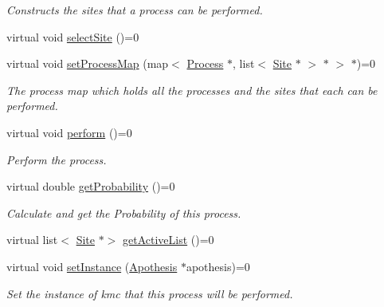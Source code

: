\begin{DoxyCompactItemize}
\begin{DoxyCompactList}\small\item\em Constructs the sites that a process can be performed. \end{DoxyCompactList}\item 
virtual void \mbox{\hyperlink{classMicroProcesses_1_1Process_a5b0a36197e03be4f36465a6b9d4f867f}{select\+Site}} ()=0
\item 
\mbox{\label{classMicroProcesses_1_1Process_a4e726f7491eb805efd9dcd1c0c3a380f}} 
virtual void \mbox{\hyperlink{classMicroProcesses_1_1Process_a4e726f7491eb805efd9dcd1c0c3a380f}{set\+Process\+Map}} (map$<$ \mbox{\hyperlink{classMicroProcesses_1_1Process}{Process}} $\ast$, list$<$ \mbox{\hyperlink{classSurfaceTiles_1_1Site}{Site}} $\ast$ $>$ $\ast$ $>$ $\ast$)=0
\begin{DoxyCompactList}\small\item\em The process map which holds all the processes and the sites that each can be performed. \end{DoxyCompactList}\item 
\mbox{\label{classMicroProcesses_1_1Process_a4247eaf16a8ea1f9b4df0d99efe3287e}} 
virtual void \mbox{\hyperlink{classMicroProcesses_1_1Process_a4247eaf16a8ea1f9b4df0d99efe3287e}{perform}} ()=0
\begin{DoxyCompactList}\small\item\em Perform the process. \end{DoxyCompactList}\item 
\mbox{\label{classMicroProcesses_1_1Process_a76c7fededf36c867251c6b803f7841bf}} 
virtual double \mbox{\hyperlink{classMicroProcesses_1_1Process_a76c7fededf36c867251c6b803f7841bf}{get\+Probability}} ()=0
\begin{DoxyCompactList}\small\item\em Calculate and get the Probability of this process. \end{DoxyCompactList}\item 
virtual list$<$ \mbox{\hyperlink{classSurfaceTiles_1_1Site}{Site}} $\ast$$>$ \mbox{\hyperlink{classMicroProcesses_1_1Process_ab2b962d50cca475005fd6d6477258e58}{get\+Active\+List}} ()=0
\item 
\mbox{\label{classMicroProcesses_1_1Process_a4c419af2e6e6477200b45bf687783c84}} 
virtual void \mbox{\hyperlink{classMicroProcesses_1_1Process_a4c419af2e6e6477200b45bf687783c84}{set\+Instance}} (\mbox{\hyperlink{classApothesis}{Apothesis}} $\ast$apothesis)=0
\begin{DoxyCompactList}\small\item\em Set the instance of kmc that this process will be performed. \end{DoxyCompactList}\end{DoxyCompactItemize}


